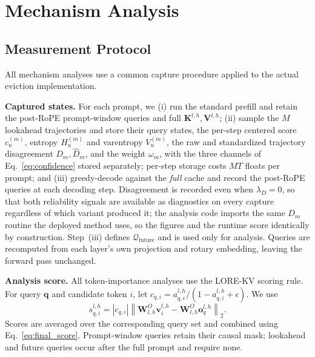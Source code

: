 \documentclass{article} %
\begin{document}
\section{Mechanism Analysis}
\label{app:experiments_extra}

\subsection{Measurement Protocol}
\label{app:mechanism_protocol}

All mechanism analyses use a common capture procedure applied to the actual eviction implementation.

\textbf{Captured states.}
For each prompt, we (i) run the standard prefill and retain the post-RoPE prompt-window queries and full
$\mathbf{K}^{l,h},\mathbf{V}^{l,h}$; (ii) sample the $M$ lookahead trajectories and store their query states, the per-step centered score $c^{(m)}_u$, entropy $H^{(m)}_u$ and varentropy $V^{(m)}_u$, the raw and standardized trajectory disagreement $D_m,\hat D_m$, and the weight $\omega_m$, with the three channels of Eq.~\ref{eq:confidence} stored separately; per-step storage costs $MT$ floats per prompt; and (iii) greedy-decode against the \emph{full} cache and record the post-RoPE queries at each decoding step. Disagreement is recorded even when $\lambda_D{=}0$, so that both reliability signals are available as diagnostics on every capture regardless of which variant produced it; the analysis code imports the same $D_m$ routine the deployed method uses, so the figures and the runtime score identically by construction. Step~(iii) defines $\mathcal{Q}_{\mathrm{future}}$ and is used only for analysis. Queries are recomputed from each layer's own projection and rotary embedding, leaving the forward pass unchanged.

\textbf{Analysis score.}
All token-importance analyses use the LORE-KV scoring rule. For query $\mathbf{q}$ and candidate token $i$, let
$c_{q,i}=a^{l,h}_{q,i}/(1-a^{l,h}_{q,i}+\epsilon)$. We use
\begin{equation}
s^{l,h}_{q,i}
=
\left|c_{q,i}\right|
\left\|
\mathbf{W}^{O}_{l,h}\mathbf{v}^{l,h}_{i}
-
\mathbf{W}^{O}_{l,h}\mathbf{o}^{l,h}_{q}
\right\|_2 .
\label{eq:analysis_score}
\end{equation}
Scores are averaged over the corresponding query set and combined using Eq.~\ref{eq:final_score}. Prompt-window queries retain their causal mask; lookahead and future queries occur after the full prompt and require none.
\end{document}
